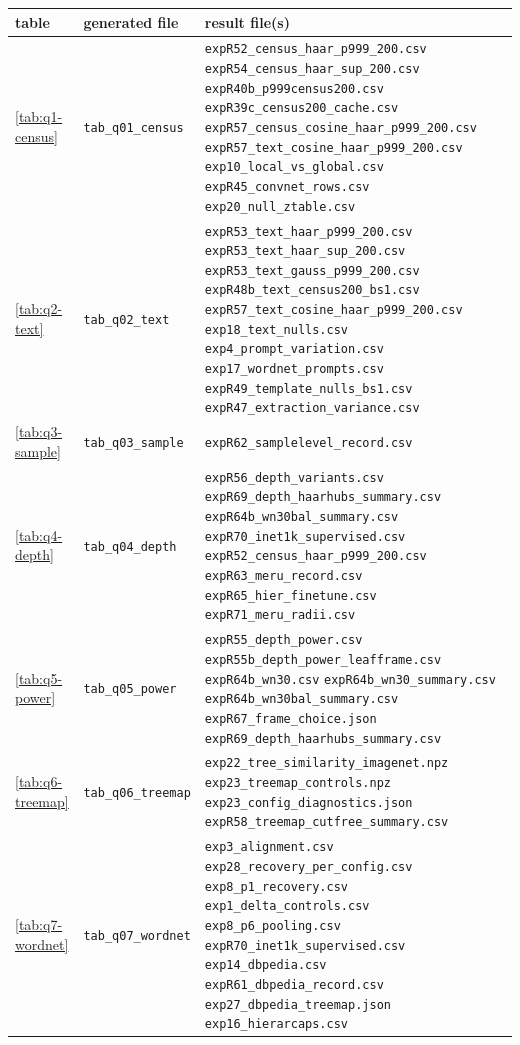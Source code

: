 \begin{table}[H]
\centering
\scriptsize
\setlength{\tabcolsep}{3pt}
\begin{tabular}{ll>{\raggedright\arraybackslash}p{9.0cm}}
\toprule
table & generated file & result file(s) \\
\midrule
\ref{tab:q1-census} & \texttt{tab\_q01\_census} & \texttt{expR52\_census\_haar\_p999\_200.csv} \texttt{expR54\_census\_haar\_sup\_200.csv} \texttt{expR40b\_p999census200.csv} \texttt{expR39c\_census200\_cache.csv} \texttt{expR57\_census\_cosine\_haar\_p999\_200.csv} \texttt{expR57\_text\_cosine\_haar\_p999\_200.csv} \texttt{exp10\_local\_vs\_global.csv} \texttt{expR45\_convnet\_rows.csv} \texttt{exp20\_null\_ztable.csv} \\
\ref{tab:q2-text} & \texttt{tab\_q02\_text} & \texttt{expR53\_text\_haar\_p999\_200.csv} \texttt{expR53\_text\_haar\_sup\_200.csv} \texttt{expR53\_text\_gauss\_p999\_200.csv} \texttt{expR48b\_text\_census200\_bs1.csv} \texttt{expR57\_text\_cosine\_haar\_p999\_200.csv} \texttt{exp18\_text\_nulls.csv} \texttt{exp4\_prompt\_variation.csv} \texttt{exp17\_wordnet\_prompts.csv} \texttt{expR49\_template\_nulls\_bs1.csv} \texttt{expR47\_extraction\_variance.csv} \\
\ref{tab:q3-sample} & \texttt{tab\_q03\_sample} & \texttt{expR62\_samplelevel\_record.csv} \\
\ref{tab:q4-depth} & \texttt{tab\_q04\_depth} & \texttt{expR56\_depth\_variants.csv} \texttt{expR69\_depth\_haarhubs\_summary.csv} \texttt{expR64b\_wn30bal\_summary.csv} \texttt{expR70\_inet1k\_supervised.csv} \texttt{expR52\_census\_haar\_p999\_200.csv} \texttt{expR63\_meru\_record.csv} \texttt{expR65\_hier\_finetune.csv} \texttt{expR71\_meru\_radii.csv} \\
\ref{tab:q5-power} & \texttt{tab\_q05\_power} & \texttt{expR55\_depth\_power.csv} \texttt{expR55b\_depth\_power\_leafframe.csv} \texttt{expR64b\_wn30.csv} \texttt{expR64b\_wn30\_summary.csv} \texttt{expR64b\_wn30bal\_summary.csv} \texttt{expR67\_frame\_choice.json} \texttt{expR69\_depth\_haarhubs\_summary.csv} \\
\ref{tab:q6-treemap} & \texttt{tab\_q06\_treemap} & \texttt{exp22\_tree\_similarity\_imagenet.npz} \texttt{exp23\_treemap\_controls.npz} \texttt{exp23\_config\_diagnostics.json} \texttt{expR58\_treemap\_cutfree\_summary.csv} \\
\ref{tab:q7-wordnet} & \texttt{tab\_q07\_wordnet} & \texttt{exp3\_alignment.csv} \texttt{exp28\_recovery\_per\_config.csv} \texttt{exp8\_p1\_recovery.csv} \texttt{exp1\_delta\_controls.csv} \texttt{exp8\_p6\_pooling.csv} \texttt{expR70\_inet1k\_supervised.csv} \texttt{exp14\_dbpedia.csv} \texttt{expR61\_dbpedia\_record.csv} \texttt{exp27\_dbpedia\_treemap.json} \texttt{exp16\_hierarcaps.csv} \\

\end{tabular}
\end{table}
